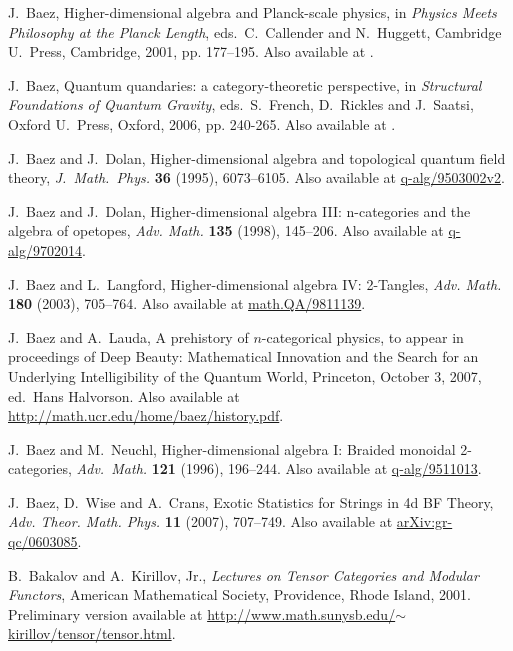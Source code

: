 \documentclass[12pt,twoside,openright]{report}
\begin{document}
\begin{thebibliography}{99}
 J.\ Baez, Higher-dimensional algebra and Planck-scale physics, in {\sl Physics Meets Philosophy at the Planck Length}, eds.\
C.\ Callender and N.\ Huggett, Cambridge U.\ Press, Cambridge,
2001, pp. 177--195.  Also available at .

 J.\ Baez, Quantum quandaries: a category-theoretic perspective, in {\sl Structural Foundations of Quantum Gravity}, eds.\
S.\ French, D.\ Rickles and J.\ Saatsi, Oxford U.\ Press, Oxford,
2006, pp. 240-265.  Also available at \quantph{0404040}.

 J.\ Baez and J.\ Dolan, Higher-dimensional algebra and topological quantum field theory, \emph{J.\ Math.\ Phys.} \textbf{36} (1995), 6073--6105.  Also available at \href{http://arxiv.org/abs/q-alg/9503002v2}{q-alg/9503002v2}.

\bibitem{HDA3} J.\ Baez and J.\ Dolan, Higher-dimensional algebra III: n-categories and the algebra of opetopes, \emph{Adv. Math.} \textbf{135} (1998), 145--206.  Also available at \href{http://arxiv.org/abs/q-alg/9702014}{q-alg/9702014}.

\bibitem{HDA4} J.\ Baez and L.\ Langford, Higher-dimensional algebra IV: 2-Tangles, \textsl{Adv. Math.} \textbf{180} (2003), 705--764. Also available at \href{http://arxiv.org/abs/math.QA/9811139}{math.QA/9811139}.

\bibitem{BL} J.\ Baez and A.\ Lauda, A prehistory of $n$-categorical physics, to appear in proceedings of Deep Beauty: Mathematical Innovation and the Search for an Underlying Intelligibility of the Quantum World, Princeton, October 3, 2007, ed.\ Hans Halvorson. Also available at \href{http://math.ucr.edu/home/baez/history.pdf}
{http://math.ucr.edu/home/baez/history.pdf}.

 J.\ Baez and M.\ Neuchl, Higher-dimensional algebra I: Braided monoidal 2-categories, \textsl{Adv.\ Math.} \textbf{121} (1996), 196--244. Also available at \href{http://arxiv.org/abs/q-alg/9511013}{q-alg/9511013}.

\bibitem{BaezWiseCrans}J.\ Baez, D.\ Wise and A.\ Crans, Exotic Statistics for Strings in 4d BF Theory, \textsl{Adv. Theor. Math. Phys.} \textbf{11} (2007), 707--749.  Also available at \href{http://arxiv.org/abs/gr-qc/0603085}{arXiv:gr-qc/0603085}.

\bibitem{BK} B.\ Bakalov and A.\ Kirillov, Jr., {\sl Lectures on Tensor Categories and Modular Functors}, American Mathematical Society, Providence, Rhode Island, 2001.  Preliminary version available at \href{http://www.math.sunysb.edu/~kirillov/tensor/tensor.html}{http://www.math.sunysb.edu/$\sim$kirillov/tensor/tensor.html}.


\end{thebibliography}
\end{document}
